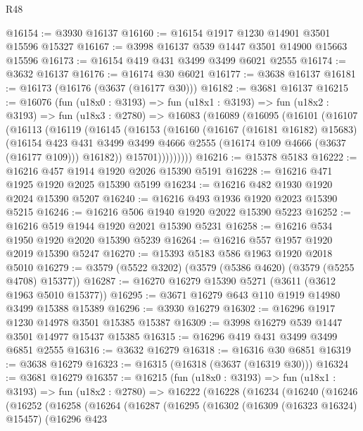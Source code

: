 \begin{lexlean}{R48}
\begin{coremodule}
@16154 := @3930 @16137
@16160 := @16154 @1917 @1230 @14901 @3501 @15596 @15327
@16167 := @3998 @16137 @539 @1447 @3501 @14900 @15663 @15596
@16173 := @16154 @419 @431 @3499 @3499 @6021 @2555
@16174 := @3632 @16137
@16176 := @16174 @30 @6021
@16177 := @3638 @16137
@16181 := @16173 (@16176 (@3637 (@16177 @30)))
@16182 := @3681 @16137
@16215 := @16076
    (fun (u18x0 : @3193) =>
    fun (u18x1 : @3193) =>
    fun (u18x2 : @3193) =>
    fun (u18x3 : @2780) =>
    @16083
      (@16089
        (@16095
          (@16101
            (@16107
              (@16113
                (@16119
                  (@16145
                    (@16153
                      (@16160
                        (@16167 (@16181 @16182) @15683)
                        (@16154
                          @423
                          @431
                          @3499
                          @3499
                          @4666
                          @2555
                          (@16174 @109 @4666 (@3637 (@16177 @109)))
                          @16182))
                      @15701)))))))))
@16216 := @15378 @5183
@16222 := @16216 @457 @1914 @1920 @2026 @15390 @5191
@16228 := @16216 @471 @1925 @1920 @2025 @15390 @5199
@16234 := @16216 @482 @1930 @1920 @2024 @15390 @5207
@16240 := @16216 @493 @1936 @1920 @2023 @15390 @5215
@16246 := @16216 @506 @1940 @1920 @2022 @15390 @5223
@16252 := @16216 @519 @1944 @1920 @2021 @15390 @5231
@16258 := @16216 @534 @1950 @1920 @2020 @15390 @5239
@16264 := @16216 @557 @1957 @1920 @2019 @15390 @5247
@16270 := @15393 @5183 @586 @1963 @1920 @2018 @5010
@16279 := @3579 (@5522 @3202) (@3579 (@5386 @4620) (@3579 (@5255 @4708) @15377))
@16287 := @16270 @16279 @15390 @5271 (@3611 (@3612 @1963 @5010 @15377))
@16295 := @3671 @16279 @643 @110 @1919 @14980 @3499 @15388 @15389
@16296 := @3930 @16279
@16302 := @16296 @1917 @1230 @14978 @3501 @15385 @15387
@16309 := @3998 @16279 @539 @1447 @3501 @14977 @15437 @15385
@16315 := @16296 @419 @431 @3499 @3499 @6851 @2555
@16316 := @3632 @16279
@16318 := @16316 @30 @6851
@16319 := @3638 @16279
@16323 := @16315 (@16318 (@3637 (@16319 @30)))
@16324 := @3681 @16279
@16357 := @16215
    (fun (u18x0 : @3193) =>
    fun (u18x1 : @3193) =>
    fun (u18x2 : @2780) =>
    @16222
      (@16228
        (@16234
          (@16240
            (@16246
              (@16252
                (@16258
                  (@16264
                    (@16287
                      (@16295
                        (@16302
                          (@16309 (@16323 @16324) @15457)
                          (@16296
                            @423

\end{coremodule}
\end{lexlean}
